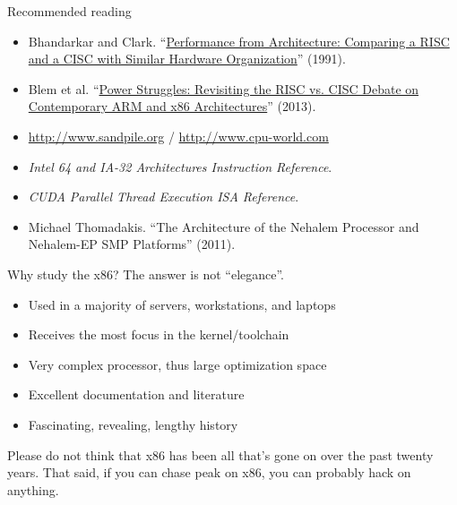 \documentclass[mathserif,xcolor={dvipsnames,table}]{beamer}
\begin{document}
\begin{frame}{Recommended reading}
\begin{itemize}
\small
\item Bhandarkar and Clark. ``\href{http://dl.acm.org/citation.cfm?id=107003}{Performance from Architecture: Comparing a
RISC and a CISC with Similar Hardware Organization}'' (1991).
\vfill
\item Blem et al. ``\href{http://research.cs.wisc.edu/vertical/papers/2013/hpca13-isa-power-struggles.pdf}{Power Struggles: Revisiting the RISC vs. CISC Debate on
Contemporary ARM and x86 Architectures}'' (2013).
\vfill
\item \href{http://www.sandpile.org}{http://www.sandpile.org} /
\href{http://www.cpu-world.com}{http://www.cpu-world.com}
\vfill
\item \textit{Intel 64 and IA-32 Architectures Instruction Reference}.
\vfill
\item \textit{CUDA Parallel Thread Execution ISA Reference}.
\vfill
\item Michael Thomadakis. ``The Architecture of the Nehalem Processor and
Nehalem-EP SMP Platforms'' (2011).
\end{itemize}
\end{frame}

\begin{frame}{Why study the x86?}
The answer is not ``elegance''.
\vfill
\begin{itemize}
\item Used in a majority of servers, workstations, and laptops
\item Receives the most focus in the kernel/toolchain
\item Very complex processor, thus large optimization space
\item Excellent documentation and literature
\item Fascinating, revealing, lengthy history
\end{itemize}
\vfill
Please do not think that x86 has been all that's gone on over the past
twenty years. That said, if you can chase peak on x86, you can
probably hack on anything.
\end{frame}
\end{document}
